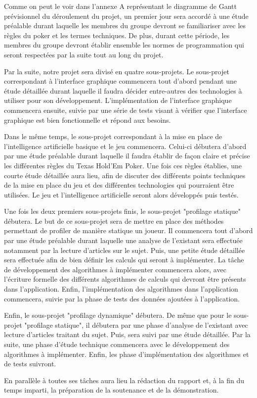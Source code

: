 \documentclass{report}
\begin{document}
\hspace{0.5cm}Comme on peut le voir dans l'annexe A représentant le diagramme de Gantt prévisionnel du déroulement du projet, un premier jour sera accordé à une étude préalable durant laquelle les membres du groupe devront se familiariser avec les règles du poker et les termes techniques. De plus, durant cette période, les membres du groupe devront établir ensemble les normes de programmation qui seront respectées par la suite tout au long du projet.\par
Par la suite, notre projet sera divisé en quatre sous-projets. 
Le sous-projet correspondant à l'interface graphique commencera tout d'abord pendant une étude détaillée durant laquelle il faudra décider entre-autres des technologies à utiliser pour son développement. L'implémentation de l'interface graphique commencera ensuite, suivie par une série de tests visant à vérifier que l'interface graphique est bien fonctionnelle et répond aux besoins. \par
Dans le même temps, le sous-projet correspondant à la mise en place de l'intelligence artificielle basique et le jeu commencera. Celui-ci débutera d'abord par une étude préalable durant laquelle il faudra établir de façon claire et précise les différentes règles du Texas Hold'Em Poker. Une fois ces règles établies, une courte étude détaillée aura lieu, afin de discuter des différents points techniques de la mise en place du jeu et des différentes technologies qui pourraient être utilisées. Le jeu et l'intelligence artificielle seront alors développés puis testés.\par
Une fois les deux premiers sous-projets finis, le sous-projet "profilage statique" débutera. Le but de ce sous-projet sera de mettre en place des méthodes permettant de profiler de manière statique un joueur. Il commencera tout d'abord par une étude préalable durant laquelle une analyse de l'existant sera effectuée notamment par la lecture d'articles sur le sujet. Puis, une petite étude détaillée sera effectuée afin de bien définir les calculs qui seront à implémenter. La tâche de développement des algorithmes à implémenter commencera alors, avec l'écriture formelle des différents algorithmes de calculs qui devront être présents dans l'application. Enfin, l'implémentation des algorithmes dans l'application commencera, suivie par la phase de tests des données ajoutées à l'application. \par
Enfin, le sous-projet "profilage dynamique" débutera. De même que pour le sous-projet "profilage statique", il débutera par une phase d'analyse de l'existant avec lecture d'articles traitant du sujet. Puis, sera suivi par une étude détaillée. Par la suite, une phase d'étude technique commencera avec le développement des algorithmes à implémenter. Enfin, les phase d'implémentation des algorithmes et de tests suivront.\par
En parallèle à toutes ses tâches aura lieu la rédaction du rapport et, à la fin du temps imparti, la préparation de la soutenance et de la démonstration. \par
\end{document}
